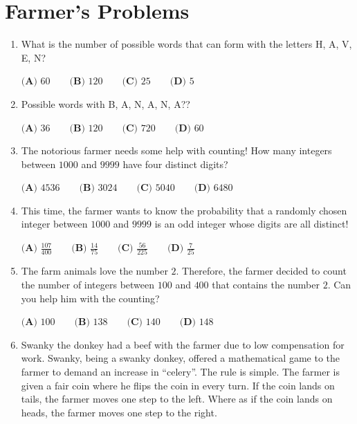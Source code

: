 \documentclass{article}
\begin{document}
\section{Farmer's Problems}
\begin{enumerate}[itemsep=1.8em]
\item
What is the number of possible words that can form
with the letters H, A, V, E, N?

$
\textbf{(A) } 60  \qquad
\textbf{(B) } 120 \qquad
\textbf{(C) } 25  \qquad
\textbf{(D) } 5
$

\item
Possible words with B, A, N, A, N, A??

$
\textbf{(A) } 36  \qquad
\textbf{(B) } 120 \qquad
\textbf{(C) } 720 \qquad
\textbf{(D) } 60
$

\item
The notorious farmer needs some help with counting!
How many integers between $1000$ and $9999$ have four
distinct digits?

$
\textbf{(A) } 4536 \qquad
\textbf{(B) } 3024 \qquad
\textbf{(C) } 5040 \qquad
\textbf{(D) } 6480
$

\item
This time, the farmer wants to know the probability
that a randomly chosen integer between $1000$ and $9999$
is an odd integer whose digits are all distinct!

$
\textbf{(A) } \frac{107}{400} \qquad
\textbf{(B) } \frac{14}{75}   \qquad
\textbf{(C) } \frac{56}{225}  \qquad
\textbf{(D) } \frac{7}{25}
$

\item
The farm animals love the number $2$. Therefore, the
farmer decided to count the number of integers between
$100$ and $400$ that contains the number $2$. Can you
help him with the counting?

$
\textbf{(A) } 100 \qquad
\textbf{(B) } 138 \qquad
\textbf{(C) } 140 \qquad
\textbf{(D) } 148
$

\item
Swanky the donkey had a beef with the farmer due to low
compensation for work. Swanky, being a swanky donkey,
offered a mathematical game to the farmer to demand
an increase in ``celery''. The rule is simple. The
farmer is given a fair coin where he flips the coin
in every turn. If the coin lands on tails, the farmer
moves one step to the left. Where as if the coin
lands on heads, the farmer moves one step to the right.


\end{enumerate}
\end{document}
